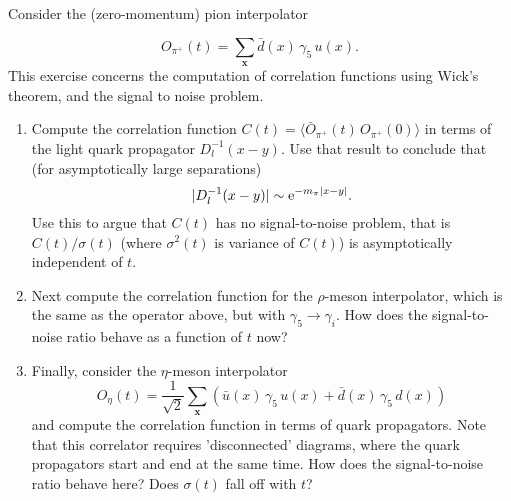 Consider the (zero-momentum) pion interpolator

\begin{equation}
	O_{\pi^{+}}(t) = \sum_{\textbf{x}} \bar{d}(x) \, \gamma_5\, u(x).
\end{equation}
This exercise concerns the computation of correlation functions using Wick's theorem, and the signal to noise problem.
\begin{enumerate}
	\item Compute the correlation function $C(t) = \langle \bar{O}_{\pi^{+}}(t) \, O_{\pi^{+}}(0) \rangle$ in terms of the light quark propagator $D_{l}^{-1}(x-y)$. Use that result to conclude that (for asymptotically large separations)
	      \begin{equation}
		      |D_{l}^{-1}(x-y)| \sim {\rm e}^{-m_{\pi}|x-y|}.
	      \end{equation}
	      Use this to argue that $C(t)$ has no signal-to-noise problem, that is $C(t)/\sigma(t)$ (where $\sigma^2(t)$ is variance of $C(t)$) is asymptotically independent of $t$.
	\item Next compute the correlation function for the $\rho$-meson interpolator, which is the same as the operator above, but with $\gamma_5 \rightarrow \gamma_i$. How does the signal-to-noise ratio behave as a function of $t$ now?
	\item Finally, consider the $\eta$-meson interpolator
	      \begin{equation}
		      O_{\eta}(t) = \frac{1}{\sqrt{2}}\sum_{\textbf{x}}\left( \bar{u}(x)\,\gamma_5\,u(x) + \bar{d}(x) \, \gamma_5\, d(x)\right)
	      \end{equation}
	      and compute the correlation function in terms of quark propagators. Note that this correlator requires 'disconnected' diagrams, where the quark propagators start and end at the same time. How does the signal-to-noise ratio behave here? Does $\sigma(t)$ fall off with $t$?
\end{enumerate}